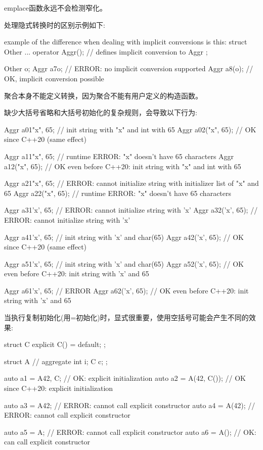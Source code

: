 emplace函数永远不会检测窄化。

处理隐式转换时的区别示例如下:

\begin{cpp}
example of the difference when dealing with implicit conversions is this:
struct Other {
	...
	operator Aggr(); // defines implicit conversion to Aggr
};

Other o;
Aggr a7{o}; // ERROR: no implicit conversion supported
Aggr a8(o); // OK, implicit conversion possible
\end{cpp}

聚合本身不能定义转换，因为聚合不能有用户定义的构造函数。

缺少大括号省略和大括号初始化的复杂规则，会导致以下行为:

\begin{cpp}
Aggr a01{"x", 65}; // init string with "x" and int with 65
Aggr a02("x", 65); // OK since C++20 (same effect)

Aggr a11{{"x", 65}}; // runtime ERROR: "x" doesn’t have 65 characters
Aggr a12({"x", 65}); // OK even before C++20: init string with "x" and int with 65

Aggr a21{{{"x", 65}}}; // ERROR: cannot initialize string with initializer list of "x" and 65
Aggr a22({{"x", 65}}); // runtime ERROR: "x" doesn’t have 65 characters

Aggr a31{'x', 65}; // ERROR: cannot initialize string with ’x’
Aggr a32('x', 65); // ERROR: cannot initialize string with ’x’

Aggr a41{{'x', 65}}; // init string with ’x’ and char(65)
Aggr a42({'x', 65}); // OK since C++20 (same effect)

Aggr a51{{{'x', 65}}}; // init string with ’x’ and char(65)
Aggr a52({{'x', 65}}); // OK even before C++20: init string with ’x’ and 65

Aggr a61{{{{'x', 65}}}}; // ERROR
Aggr a62({{{'x', 65}}}); // OK even before C++20: init string with ’x’ and 65
\end{cpp}

当执行复制初始化(用=初始化)时，显式很重要，使用空括号可能会产生不同的效果:

\begin{cpp}
struct C {
	explicit C() = default;
};

struct A { // aggregate
	int i;
	C c;
};

auto a1 = A{42, C{}}; // OK: explicit initialization
auto a2 = A(42, C()); // OK since C++20: explicit initialization

auto a3 = A{42}; // ERROR: cannot call explicit constructor
auto a4 = A(42); // ERROR: cannot call explicit constructor

auto a5 = A{}; // ERROR: cannot call explicit constructor
auto a6 = A(); // OK: can call explicit constructor
\end{cpp}

